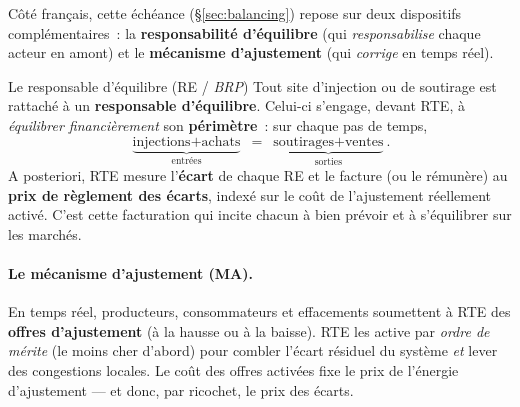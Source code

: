 \documentclass[11pt,a4paper]{article}
\begin{document}
Côté français, cette échéance (\S\ref{sec:balancing}) repose sur deux
dispositifs complémentaires~: la \textbf{responsabilité d'équilibre} (qui
\emph{responsabilise} chaque acteur en amont) et le \textbf{mécanisme
d'ajustement} (qui \emph{corrige} en temps réel).

\begin{defbox}{Le responsable d'équilibre (RE / \emph{BRP})}
Tout site d'injection ou de soutirage est rattaché à un \textbf{responsable
d'équilibre}. Celui-ci s'engage, devant RTE, à \emph{équilibrer financièrement}
son \textbf{périmètre}~: sur chaque pas de temps,
\[
  \underbrace{\text{injections}+\text{achats}}_{\text{entrées}}
  \;=\;
  \underbrace{\text{soutirages}+\text{ventes}}_{\text{sorties}} .
\]
A posteriori, RTE mesure l'\textbf{écart} de chaque RE et le facture (ou le
rémunère) au \textbf{prix de règlement des écarts}, indexé sur le coût de
l'ajustement réellement activé. C'est cette facturation qui incite chacun à
bien prévoir et à s'équilibrer sur les marchés.
\end{defbox}

\begin{center}
\end{center}

\paragraph{Le mécanisme d'ajustement (MA).} En temps réel, producteurs,
consommateurs et effacements soumettent à RTE des \textbf{offres
d'ajustement} (à la hausse ou à la baisse). RTE les active par \emph{ordre de
mérite} (le moins cher d'abord) pour combler l'écart résiduel du système
\emph{et} lever des congestions locales. Le coût des offres activées fixe le
prix de l'énergie d'ajustement — et donc, par ricochet, le prix des écarts.
\end{document}
